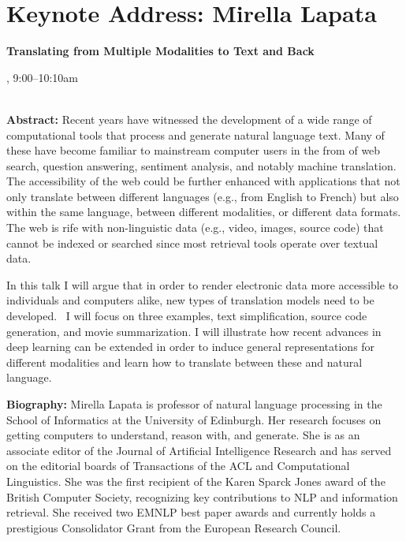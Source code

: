 \section{Keynote Address: Mirella Lapata}

\begin{center}
\begin{Large}
{\bfseries\Large Translating from Multiple Modalities to Text and Back}\vspace{1em}\par
\end{Large}

\daydateyear, 9:00--10:10am \vspace{1em}\\
\PlenaryLoc \\
\vspace{1em}\par
\end{center}

\noindent
{\bfseries Abstract:} Recent years have witnessed the development of a wide range of computational tools that process and generate natural language text. Many of these have become familiar to mainstream computer users in the from of web search, question answering, sentiment analysis, and notably machine translation. The accessibility of the web could be further enhanced with applications that not only translate between different languages (e.g., from English to French) but also within the same language, between different modalities, or different data formats. The web is rife with non-linguistic data (e.g., video, images, source code) that cannot be indexed or searched since most retrieval tools operate over textual data.

In this talk I will argue that in order to render electronic data more accessible to individuals and computers alike, new types of translation models need to be developed.  I will focus on three examples, text simplification, source code generation, and movie summarization. I will illustrate how recent advances in deep learning can be extended in order to induce general representations for different modalities and learn how to translate between these and natural language.

\vspace{3em}\par 

\vfill
\noindent

{\bfseries Biography:} Mirella Lapata is professor of natural language processing in the School of Informatics at the University of Edinburgh. Her research focuses on getting computers to understand, reason with, and generate. She is as an associate editor of the Journal of Artificial Intelligence Research and has served on the editorial boards of Transactions of the ACL and Computational Linguistics. She was the first recipient of the Karen Sparck Jones award of the British Computer Society, recognizing key contributions to NLP and information retrieval. She received two EMNLP best paper awards and currently holds a prestigious Consolidator Grant from the European Research Council.

\newpage
